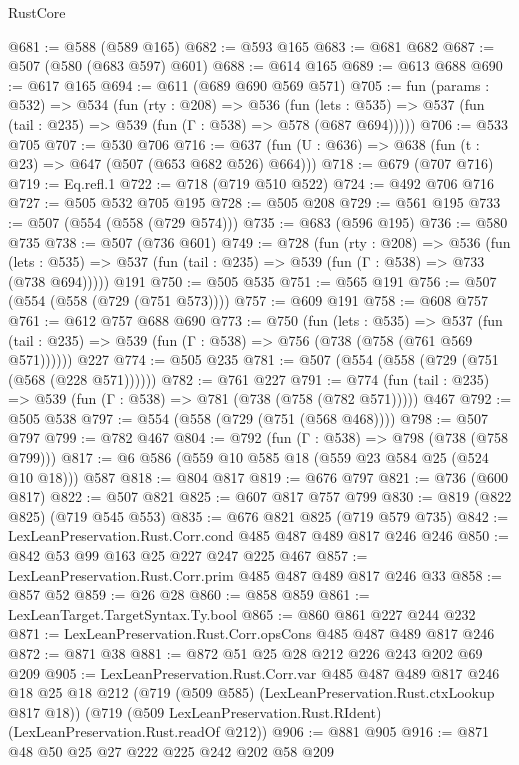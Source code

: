 \begin{lexlean}{RustCore}
\begin{coremodule}
@681 := @588 (@589 @165)
@682 := @593 @165
@683 := @681 @682
@687 := @507 (@580 (@683 @597) @601)
@688 := @614 @165
@689 := @613 @688
@690 := @617 @165
@694 := @611 (@689 @690 @569 @571)
@705 := fun (params : @532) =>
  @534
    (fun (rty : @208) =>
    @536
      (fun (lets : @535) => @537 (fun (tail : @235) => @539 (fun (Γ : @538) => @578 (@687 @694)))))
@706 := @533 @705
@707 := @530 @706
@716 := @637 (fun (U : @636) => @638 (fun (t : @23) => @647 (@507 (@653 @682 @526) @664)))
@718 := @679 (@707 @716)
@719 := Eq.refl.{1}
@722 := @718 (@719 @510 @522)
@724 := @492 @706 @716
@727 := @505 @532 @705 @195
@728 := @505 @208
@729 := @561 @195
@733 := @507 (@554 (@558 (@729 @574)))
@735 := @683 (@596 @195)
@736 := @580 @735
@738 := @507 (@736 @601)
@749 := @728
    (fun (rty : @208) =>
    @536
      (fun (lets : @535) => @537 (fun (tail : @235) => @539 (fun (Γ : @538) => @733 (@738 @694)))))
    @191
@750 := @505 @535
@751 := @565 @191
@756 := @507 (@554 (@558 (@729 (@751 @573))))
@757 := @609 @191
@758 := @608 @757
@761 := @612 @757 @688 @690
@773 := @750
    (fun (lets : @535) =>
    @537 (fun (tail : @235) => @539 (fun (Γ : @538) => @756 (@738 (@758 (@761 @569 @571))))))
    @227
@774 := @505 @235
@781 := @507 (@554 (@558 (@729 (@751 (@568 (@228 @571))))))
@782 := @761 @227
@791 := @774 (fun (tail : @235) => @539 (fun (Γ : @538) => @781 (@738 (@758 (@782 @571))))) @467
@792 := @505 @538
@797 := @554 (@558 (@729 (@751 (@568 @468))))
@798 := @507 @797
@799 := @782 @467
@804 := @792 (fun (Γ : @538) => @798 (@738 (@758 @799)))
@817 := @6 @586 (@559 @10 @585 @18 (@559 @23 @584 @25 (@524 @10 @18))) @587
@818 := @804 @817
@819 := @676 @797
@821 := @736 (@600 @817)
@822 := @507 @821
@825 := @607 @817 @757 @799
@830 := @819 (@822 @825) (@719 @545 @553)
@835 := @676 @821 @825 (@719 @579 @735)
@842 := LexLeanPreservation.Rust.Corr.cond @485 @487 @489 @817 @246 @246
@850 := @842 @53 @99 @163 @25 @227 @247 @225 @467
@857 := LexLeanPreservation.Rust.Corr.prim @485 @487 @489 @817 @246 @33
@858 := @857 @52
@859 := @26 @28
@860 := @858 @859
@861 := LexLeanTarget.TargetSyntax.Ty.bool
@865 := @860 @861 @227 @244 @232
@871 := LexLeanPreservation.Rust.Corr.opsCons @485 @487 @489 @817 @246
@872 := @871 @38
@881 := @872 @51 @25 @28 @212 @226 @243 @202 @69 @209
@905 := LexLeanPreservation.Rust.Corr.var
    @485
    @487
    @489
    @817
    @246
    @18
    @25
    @18
    @212
    (@719 (@509 @585) (LexLeanPreservation.Rust.ctxLookup @817 @18))
    (@719 (@509 LexLeanPreservation.Rust.RIdent) (LexLeanPreservation.Rust.readOf @212))
@906 := @881 @905
@916 := @871 @48 @50 @25 @27 @222 @225 @242 @202 @58 @209

\end{coremodule}
\end{lexlean}
